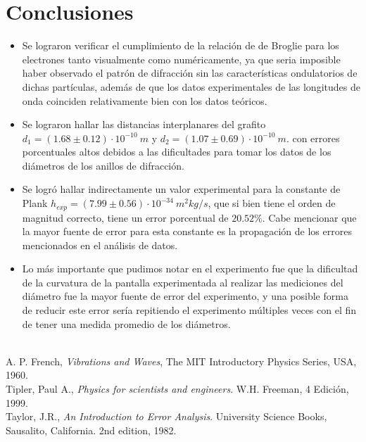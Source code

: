 \documentclass[prb,aps,twocolumn,preprintnumbers,amsmath,amssymb]{revtex4}
\begin{document}
\section{Conclusiones}

\begin{itemize}

	\item Se lograron verificar el cumplimiento de la relación de de Broglie para los electrones tanto visualmente como numéricamente, ya que seria imposible haber observado el patrón de difracción sin las características ondulatorios de dichas partículas, además de que los datos experimentales de las longitudes de onda coinciden relativamente bien con los datos teóricos.
	
	\item Se lograron hallar las distancias interplanares del grafito $d_{1} = (1.68 \pm 0.12 )\cdot 10^{-10}\ m$ y $d_{2} = (1.07 \pm 0.69 )\cdot 10^{-10}\ m.$ con errores porcentuales altos debidos a las dificultades para tomar los datos de los diámetros de los anillos de difracción.
	
	\item Se logró hallar indirectamente un valor experimental para la constante de Plank $h_{exp} = (7.99 \pm 0.56) \cdot 10^{-34}\ m^2kg/s$, que si bien tiene el orden de magnitud correcto, tiene un error porcentual de $20.52\%$. Cabe mencionar que la mayor fuente de error para esta constante es la propagación de los errores mencionados en el análisis de datos.
		
	\item Lo más importante que pudimos notar en el experimento fue que la dificultad de la curvatura de la pantalla experimentada al realizar las mediciones del diámetro fue la mayor fuente de error del experimento, y una posible forma de reducir este error sería repitiendo el experimento múltiples veces con el fin de tener una medida promedio de los diámetros.
	
\end{itemize}

\begin{thebibliography}{99}
\
\\
 A. P. French, {\it Vibrations and Waves}{, The MIT Introductory Physics Series, USA, 1960}.\\
\bibitem{Tipler} Tipler, Paul A., \textit{Physics for scientists and engineers}. W.H. Freeman, 4 Edici\' on, 1999.\\
\bibitem{Taylor} Taylor, J.R., \textit{An Introduction to Error Analysis}. University Science Books, Sausalito, California. 2nd edition, 1982.\\
\end{thebibliography}
\end{document}
